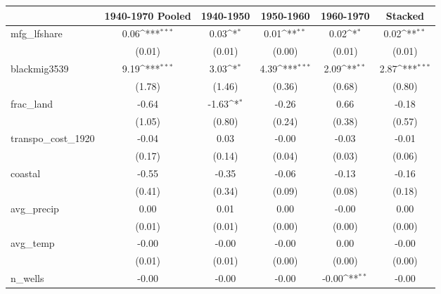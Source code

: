 {
\def\sym#1{\ifmmode^{#1}\else\(^{#1}\)\fi}
\begin{tabular}{l*{5}{c}}
\toprule
          &\multicolumn{1}{c}{1940-1970 Pooled}&\multicolumn{1}{c}{1940-1950}&\multicolumn{1}{c}{1950-1960}&\multicolumn{1}{c}{1960-1970}&\multicolumn{1}{c}{Stacked}\\
\midrule
mfg\_lfshare&     0.06\sym{***}&     0.03\sym{*}  &     0.01\sym{**} &     0.02\sym{*}  &     0.02\sym{**} \\
          &   (0.01)         &   (0.01)         &   (0.00)         &   (0.01)         &   (0.01)         \\
\addlinespace
blackmig3539&     9.19\sym{***}&     3.03\sym{*}  &     4.39\sym{***}&     2.09\sym{**} &     2.87\sym{***}\\
          &   (1.78)         &   (1.46)         &   (0.36)         &   (0.68)         &   (0.80)         \\
\addlinespace
frac\_land &    -0.64         &    -1.63\sym{*}  &    -0.26         &     0.66         &    -0.18         \\
          &   (1.05)         &   (0.80)         &   (0.24)         &   (0.38)         &   (0.57)         \\
\addlinespace
transpo\_cost\_1920&    -0.04         &     0.03         &    -0.00         &    -0.03         &    -0.01         \\
          &   (0.17)         &   (0.14)         &   (0.04)         &   (0.03)         &   (0.06)         \\
\addlinespace
coastal   &    -0.55         &    -0.35         &    -0.06         &    -0.13         &    -0.16         \\
          &   (0.41)         &   (0.34)         &   (0.09)         &   (0.08)         &   (0.18)         \\
\addlinespace
avg\_precip&     0.00         &     0.01         &     0.00         &    -0.00         &     0.00         \\
          &   (0.01)         &   (0.01)         &   (0.00)         &   (0.00)         &   (0.00)         \\
\addlinespace
avg\_temp  &    -0.00         &    -0.00         &    -0.00         &     0.00         &    -0.00         \\
          &   (0.01)         &   (0.01)         &   (0.00)         &   (0.00)         &   (0.00)         \\
\addlinespace
n\_wells   &    -0.00         &    -0.00         &    -0.00         &    -0.00\sym{**} &    -0.00         \\

\end{tabular}}
